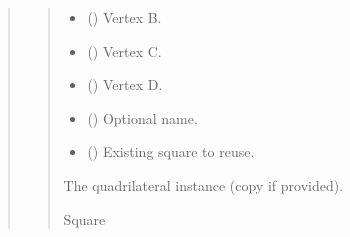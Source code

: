 \documentclass[letterpaper,10pt,english]{sphinxmanual}
\begin{document}
\begin{quote}
\begin{fulllineitems}
\begin{fulllineitems}
\begin{quote}
\begin{description}
\begin{itemize}
\item {} 
\sphinxAtStartPar
{} (\sphinxstyleliteralemphasis{\sphinxupquote{ | }}) \textendash{} Vertex B.

\item {} 
\sphinxAtStartPar
{} (\sphinxstyleliteralemphasis{\sphinxupquote{ | }}) \textendash{} Vertex C.

\item {} 
\sphinxAtStartPar
{} (\sphinxstyleliteralemphasis{\sphinxupquote{ | }}) \textendash{} Vertex D.

\item {} 
\sphinxAtStartPar
{} (\sphinxstyleliteralemphasis{\sphinxupquote{ | }}) \textendash{} Optional name.

\item {} 
\sphinxAtStartPar
{} (\sphinxstyleliteralemphasis{\sphinxupquote{ | }}) \textendash{} Existing square to reuse.

\end{itemize}

\sphinxAtStartPar
The quadrilateral instance (copy if provided).

\sphinxAtStartPar
Square

\end{description}\end{quote}

\end{fulllineitems}



\end{fulllineitems}
\end{quote}
\end{document}
